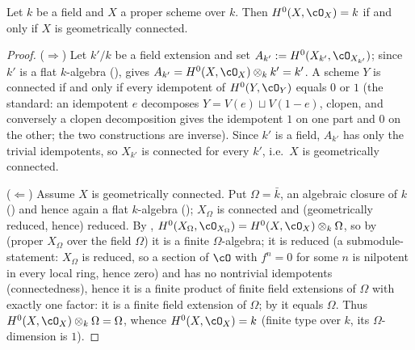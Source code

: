 \begin{lemma}[$H^0=k$ and geometric connectedness]
\label{lem:pc-h0-geom-connected}
Let $k$ be a field and $X$ a proper
scheme over $k$.  Then $H^0(X,\cO_X)=k$ if and only if $X$ is
geometrically connected.
\end{lemma}
\begin{proof}
($\Rightarrow$) Let $k'/k$ be a field extension and set
$A_{k'}:=H^0(X_{k'},\cO_{X_{k'}})$; since $k'$ is a flat $k$-algebra
(),  gives
$A_{k'}=H^0(X,\cO_X)\otimes_kk'=k'$.  A scheme $Y$ is connected if and
only if every idempotent of $H^0(Y,\cO_Y)$ equals $0$ or $1$
(the standard: an idempotent $e$ decomposes $Y=V(e)\sqcup V(1-e)$,
clopen, and conversely a clopen decomposition gives the idempotent
$1$ on one part and $0$ on the other; the two constructions are
inverse).  Since $k'$ is a field, $A_{k'}$ has only the trivial
idempotents, so $X_{k'}$ is connected for every $k'$, i.e.\ $X$ is
geometrically connected.

($\Leftarrow$) Assume $X$ is geometrically connected.  Put
$\Omega=\bar k$, an algebraic closure of $k$
() and hence again a flat $k$-algebra
(); $X_\Omega$ is connected and (geometrically reduced,
hence) reduced.  By ,
$H^0(X_\Omega,\cO_{X_\Omega})=H^0(X,\cO_X)\otimes_k\Omega$, so by
 (proper $X_\Omega$ over the field $\Omega$)
it is a finite $\Omega$-algebra; it is reduced (a submodule-statement:
$X_\Omega$ is reduced, so a section of $\cO$ with $f^n=0$ for some
$n$ is nilpotent in every local ring, hence zero) and has no
nontrivial idempotents (connectedness), hence it is a finite product
of finite field extensions of $\Omega$ with exactly one factor: it is a
finite field extension of $\Omega$; by
 it equals $\Omega$.  Thus
$H^0(X,\cO_X)\otimes_k\Omega=\Omega$, whence
$H^0(X,\cO_X)=k$ (finite type over $k$, its $\Omega$-dimension is
$1$).
\end{proof}






